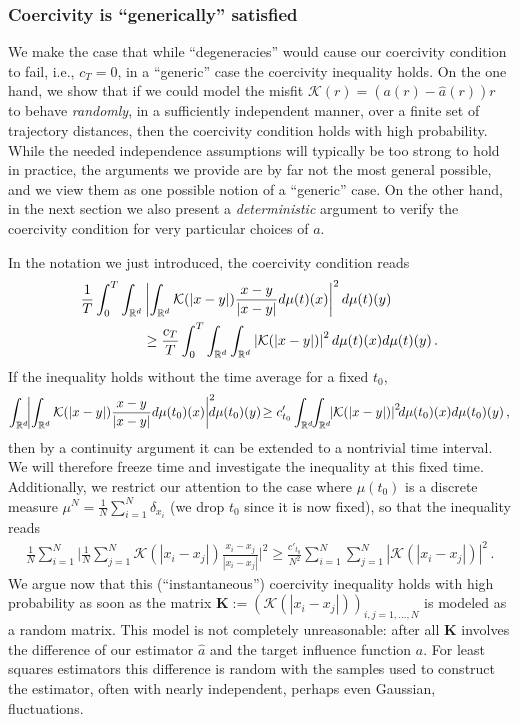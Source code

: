 \subsubsection{Coercivity is ``generically'' satisfied}\label{randomod}
We make the case that while ``degeneracies'' would cause our coercivity condition to fail, i.e., $c_T=0$, in a ``generic'' case the coercivity inequality holds.
On the one hand, we show that if we could model the misfit $\mathcal K(r)=(a(r)- \widehat a(r))r$ to behave {\it randomly}, in a sufficiently independent manner, over a finite set of trajectory distances, then
the coercivity condition holds with high probability. While the needed independence assumptions will typically be  too strong {to hold} in practice, the arguments we provide are by far not the most general possible, and we view them as one possible notion of a ``generic'' case.
On the other hand, in the next section we also present a {\it deterministic} argument to verify the coercivity condition for very particular choices of $a$.

In the notation we just introduced, the coercivity condition reads
\begin{align*}
\frac1T\int_0^T\int_{\mathbb{R}^d}&\left|\int_{\mathbb{R}^d} \mathcal K(|x-y|)\frac{x-y}{|x-y|}d\mu(t)(x)\right|^2d\mu(t)(y) \\
&\ge\frac{c_T}{T}\int_0^T\int_{\mathbb{R}^d}\int_{\mathbb{R}^d}\left| \mathcal K(|x-y|)\right|^2d\mu(t)(x)d\mu(t)(y)\,.
\end{align*}
If the inequality holds without the time average for a fixed $t_0$,
\begin{align*}
\int_{\R^d}\!\!\left|\int_{\R^d} \mathcal K(|x-y|)\frac{x-y}{|x-y|}d\mu(t_0)(x)\right|^2\!\!\!\!d\mu(t_0)(y)\!
\ge c_{t_0}'\int_{\R^d}\!\!\int_{\R^d}\!\!\left| \mathcal K(|x-y|)\right|^2\!\!d\mu(t_0)(x)d\mu(t_0)(y)\,,
\end{align*}
then by a continuity argument it can be extended to a nontrivial time interval. We will therefore freeze time and investigate the inequality at this fixed time. 
Additionally, we restrict our attention to the case where $\mu(t_0)$ is a discrete measure $\mu^N=\frac1N\sum_{i=1}^N\delta_{x_i}$ (we drop $t_0$ since it is now fixed), so that the inequality reads
\begin{align}
\frac1N\sum_{i=1}^N\bigg|\frac{1}{N} \sum_{j=1}^N  \mathcal K(|x_i-x_j|)\frac{x_i-x_j}{|x_i-x_j|}\bigg|^2\ge \frac{c'_{t_0}}{N^2}\sum_{i=1}^N\sum_{j=1}^N\left| \mathcal K(|x_i-x_j|)\right|^2\,.
\label{e:coercivitydiscrete}
\end{align}
We argue now that this (``instantaneous'') coercivity inequality holds with high probability as soon as the matrix $\mathbf{K}:=(\mathcal K(|x_i-x_j|))_{i,j=1,\dots,N}$ is modeled as a random matrix.
This model is not completely unreasonable: after all $\mathbf K$ involves the difference of our estimator $\widehat a$ and the target influence function $a$. For least squares estimators this difference is random with the samples used to construct the estimator, often with nearly independent, perhaps even Gaussian, fluctuations. 


